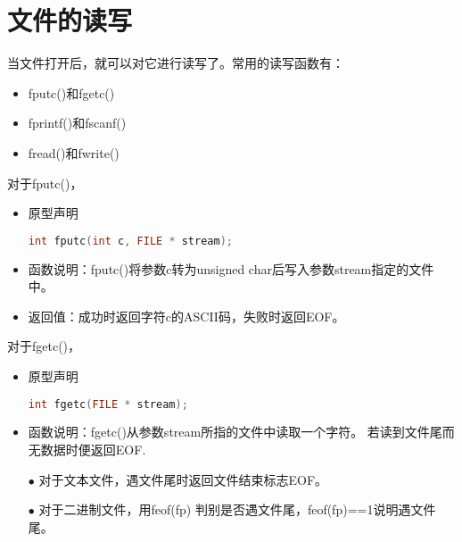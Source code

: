 \section{文件的读写}
\begin{frame}[fragile]\ft{\secname}
  当文件打开后，就可以对它进行读写了。常用的读写函数有：\vspace{.05in}

  \begin{itemize}
  \item {\tf fputc()}和{\tf fgetc()}    \\[0.1in]
  \item {\tf fprintf()}和{\tf fscanf()} \\[0.1in]
  \item {\tf fread()}和{\tf fwrite()}   
  \end{itemize}
\end{frame}


\begin{frame}[fragile]
  对于{\tf fputc()}，
  \begin{itemize}
    \item 原型声明
    \begin{lstlisting}[language=c,backgroundcolor=\color{red!20}]
int fputc(int c, FILE * stream);
    \end{lstlisting}
  \item 函数说明：{\tf fputc()}将参数{\tf c}转为{\tf unsigned char}后写入参数{\tf stream}指定的文件中。
  \item 返回值：成功时返回字符{\tf c}的{\tf ASCII}码，失败时返回{\tf EOF}。
  \end{itemize}
\end{frame}

\begin{frame}[fragile]
  对于{\tf fgetc()}，
  \begin{itemize}
    \item 原型声明
    \begin{lstlisting}[language=c,backgroundcolor=\color{red!20}]
int fgetc(FILE * stream);
    \end{lstlisting}
    \item 函数说明：{\tf fgetc()}从参数{\tf stream}所指的文件中读取一个字符。 若读到文件尾而无数据时便返回{\tf EOF}.
  \end{itemize}
  \begin{itemize}
  \item[$\bullet$]  对于文本文件，遇文件尾时返回文件结束标志{\tf EOF}。\\[0.1in]
  \item[$\bullet$]  对于二进制文件，用{\tf feof(fp)} 判别是否遇文件尾，{\tf feof(fp)==1}说明遇文件尾。
  \end{itemize}
\end{frame}

